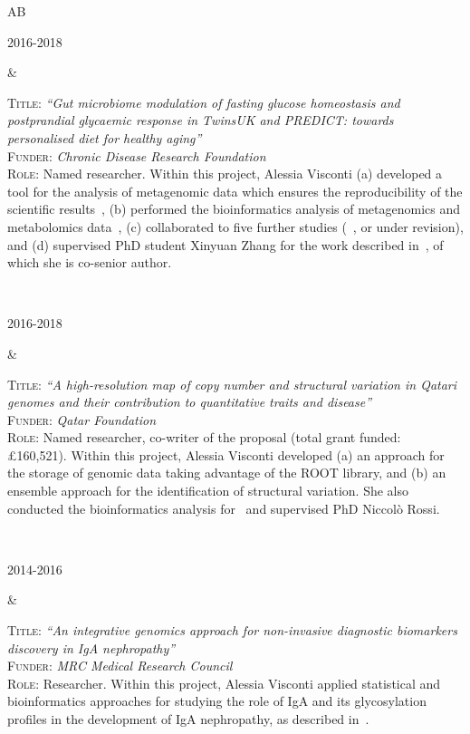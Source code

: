 \documentclass[a4paper,10pt]{article}
\newenvironment{doubletablelist}
{
	\vspace{-0.2cm}
	\begin{longtable}[!h]{AB}}{\end{longtable}
}
\newcommand{\dtlist}[2]{
\hspace{-3cm}
\noindent
	\begin{minipage}{0.22\textwidth}
	\begin{flushright}
	\textsc{#1}
	\end{flushright}
	\end{minipage}
	& #2\\[0.2cm]
}
\begin{document}
\begin{doubletablelist}
	\dtlist{2016-2018}{  \begin{minipage}[t]{0.65\textwidth}
		\textsc{Title:} \emph{``Gut microbiome modulation of fasting glucose homeostasis and postprandial glycaemic response in TwinsUK and PREDICT: towards personalised diet for healthy aging''}\\
		\textsc{Funder:} \emph{Chronic Disease Research Foundation}\\
		\textsc{Role:} Named researcher. Within this project, Alessia Visconti (a) developed a tool for the analysis of metagenomic data which ensures the reproducibility of the scientific results~\cite{Vis18b}, (b) performed the bioinformatics analysis of metagenomics and metabolomics data~\cite{Vis19,Bar20}, (c) collaborated to five further studies (~\cite{Lou23}, or under revision), and (d) supervised PhD student Xinyuan Zhang for the work described in~\cite{Zha22}, of which she is co-senior author.
	\end{minipage}}
	
	\dtlist{2016-2018}{  \begin{minipage}[t]{0.65\textwidth}
		\textsc{Title:} \emph{``A high-resolution map of copy number and structural variation in Qatari genomes and their contribution to quantitative traits and disease''}\\
		\textsc{Funder:} \emph{Qatar Foundation}\\
		\textsc{Role:} Named researcher, co-writer of the proposal (total grant funded: £160,521). Within this project, Alessia Visconti developed (a) an approach for the storage of genomic data taking advantage of the ROOT library, and (b) an ensemble approach for the identification of structural variation. She also conducted the bioinformatics analysis for~\cite{Ros21} and supervised PhD Niccol\`o Rossi.
	\end{minipage}}
	
	\dtlist{2014-2016}{  \begin{minipage}[t]{0.65\textwidth}
		\textsc{Title:} \emph{``An integrative genomics approach for non-invasive diagnostic biomarkers discovery in IgA nephropathy''}\\
		\textsc{Funder:} \emph{MRC Medical Research Council}\\
		\textsc{Role:} Researcher. Within this project, Alessia Visconti applied statistical and bioinformatics approaches for studying the role of IgA and its glycosylation profiles in the development of IgA nephropathy, as described in~\cite{Lom16,Dot21}.
	\end{minipage}}
	

\end{doubletablelist}
\end{document}
